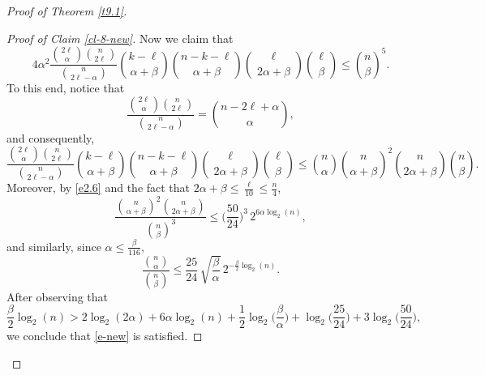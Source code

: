 \documentclass[10pt]{amsart}
\theoremstyle{remark}
\newcommand{\mik}{\leqslant}
\begin{document}
\begin{proof}[Proof of Theorem \emph{\ref{t9.1}}]
\begin{proof}[Proof of Claim \emph{\ref{cl-8-new}}]
Now we claim that
\begin{equation} \label{e-new}
4\alpha^2\frac{\binom{2\ell}{\alpha}\binom{n}{2\ell}}{\binom{n}{2\ell-\alpha}}
\binom{k-\ell}{\alpha+\beta}\binom{n-k-\ell}{\alpha+\beta}
\binom{\ell}{2\alpha+\beta}\binom{\ell}{\beta} \mik \binom{n}{\beta}^5.
\end{equation}
To this end, notice that
\begin{equation} \label{en9.4}
\frac{\binom{2\ell}{\alpha}\binom{n}{2\ell}}{\binom{n}{2\ell-\alpha}}=\binom{n-2\ell+\alpha}{\alpha},
\end{equation}
and consequently,
\begin{equation} \label{en9.5}
\frac{\binom{2\ell}{\alpha}\binom{n}{2\ell}}{\binom{n}{2\ell-\alpha}}
\binom{k-\ell}{\alpha+\beta}\binom{n-k-\ell}{\alpha+\beta}
\binom{\ell}{2\alpha+\beta}\binom{\ell}{\beta} \mik
\binom{n}{\alpha} \binom{n}{\alpha+\beta}^2 \binom{n}{2\alpha+\beta}\binom{n}{\beta}.
\end{equation}
Moreover, by \eqref{e2.6} and the fact that $2\alpha+\beta \mik \frac{\ell}{10}\mik \frac{n}{4}$,
\begin{equation} \label{en9.6}
\frac{\binom{n}{\alpha+\beta}^2 \binom{n}{2\alpha+\beta}}{\binom{n}{\beta}^3} \mik
\Big(\frac{50}{24}\Big)^3 \, 2^{6\alpha\log_2(n)},
\end{equation}
and similarly, since $\alpha\mik \frac{\beta}{116}$,
\begin{equation} \label{en9.7}
\frac{\binom{n}{\alpha}}{\binom{n}{\beta}} \mik
\frac{25}{24}\, \sqrt{\frac{\beta}{\alpha}}\, 2^{-\frac{\beta}{2}\log_2(n)}.
\end{equation}
After observing that
\begin{equation} \label{en9.8}
\frac{\beta}{2} \log_2(n)> 2\log_2(2\alpha)+6\alpha \log_2(n)+ \frac{1}{2}\log_2\Big(\frac{\beta}{\alpha}\Big) +
\log_2\Big(\frac{25}{24}\Big) + 3\log_2\Big(\frac{50}{24}\Big),
\end{equation}
we conclude that \eqref{e-new} is satisfied.


\end{proof}
\end{proof}
\end{document}
